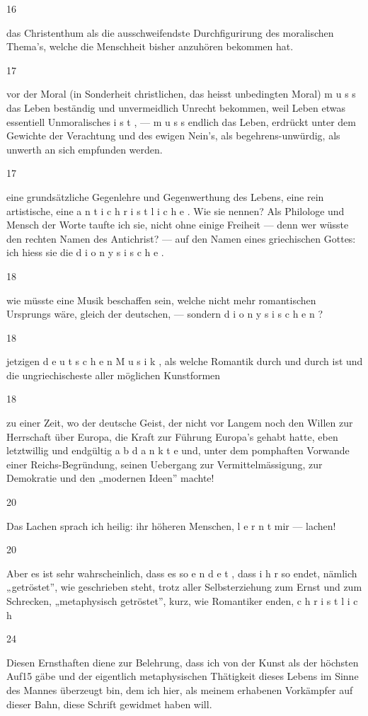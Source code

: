 \documentclass[
  letterpaper,
  DIV=11,
  numbers=noendperiod]{scrartcl}
\begin{document}
16

das Christenthum als die ausschweifendste Durchfigurirung des
moralischen Thema's, welche die Menschheit bisher anzuhören bekommen
hat.

17

vor der Moral (in Sonderheit christlichen, das heisst unbedingten Moral)
m u s s das Leben beständig und unvermeidlich Unrecht bekommen, weil
Leben etwas essentiell Unmoralisches i s t , --- m u s s endlich das
Leben, erdrückt unter dem Gewichte der Verachtung und des ewigen Nein's,
als begehrens-unwürdig, als unwerth an sich empfunden werden.

17

eine grundsätzliche Gegenlehre und Gegenwerthung des Lebens, eine rein
artistische, eine a n t i c h r i s t l i c h e . Wie sie nennen? Als
Philologe und Mensch der Worte taufte ich sie, nicht ohne einige
Freiheit --- denn wer wüsste den rechten Namen des Antichrist? --- auf
den Namen eines griechischen Gottes: ich hiess sie die d i o n y s i s c
h e .

18

wie müsste eine Musik beschaffen sein, welche nicht mehr romantischen
Ursprungs wäre, gleich der deutschen, --- sondern d i o n y s i s c h e
n ?

18

jetzigen d e u t s c h e n M u s i k , als welche Romantik durch und
durch ist und die ungriechischeste aller möglichen Kunstformen

18

zu einer Zeit, wo der deutsche Geist, der nicht vor Langem noch den
Willen zur Herrschaft über Europa, die Kraft zur Führung Europa's gehabt
hatte, eben letztwillig und endgültig a b d a n k t e und, unter dem
pomphaften Vorwande einer Reichs-Begründung, seinen Uebergang zur
Vermittelmässigung, zur Demokratie und den „modernen Ideen'' machte!

20

Das Lachen sprach ich heilig: ihr höheren Menschen, l e r n t mir ---
lachen!

20

Aber es ist sehr wahrscheinlich, dass es so e n d e t , dass i h r so
endet, nämlich „getröstet'', wie geschrieben steht, trotz aller
Selbsterziehung zum Ernst und zum Schrecken, „metaphysisch getröstet'',
kurz, wie Romantiker enden, c h r i s t l i c h

24

Diesen Ernsthaften diene zur Belehrung, dass ich von der Kunst als der
höchsten Auf15 gäbe und der eigentlich metaphysischen Thätigkeit dieses
Lebens im Sinne des Mannes überzeugt bin, dem ich hier, als meinem
erhabenen Vorkämpfer auf dieser Bahn, diese Schrift gewidmet haben will.
\end{document}
